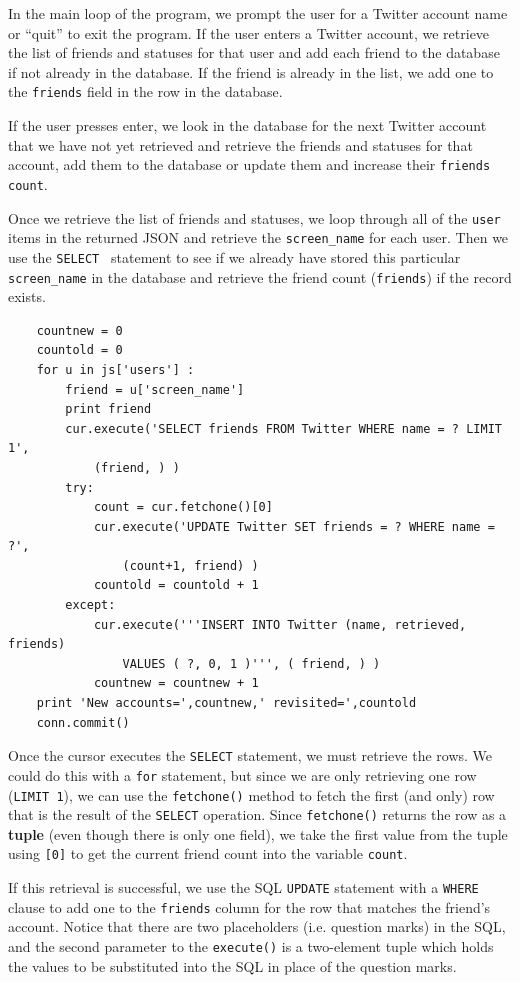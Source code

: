 In the main loop of the program, we prompt the user for a Twitter
account name or ``quit'' to exit the program.  
If the user enters a Twitter account, we retrieve the 
list of friends and statuses
for that user and add each friend to the database if 
not already in the database.  If the friend is already in the list, 
we add one to the {\tt friends} field in the row in the database.

If the user presses enter, we look in the database for the next 
Twitter account that we have not yet retrieved and retrieve the
friends and statuses for that account, add them to the database 
or update them and increase their {\tt friends count}.

Once we retrieve the list of friends and statuses, we loop 
through all of the {\tt user} items in the returned JSON
and retrieve the \verb"screen_name" for each user.  Then we use
the {\tt SELECT } statement to see if we already have stored this
particular \verb"screen_name" in the database and retrieve the
friend count ({\tt friends}) if the record exists.

\beforeverb
\begin{verbatim}
    countnew = 0
    countold = 0
    for u in js['users'] :
        friend = u['screen_name']
        print friend
        cur.execute('SELECT friends FROM Twitter WHERE name = ? LIMIT 1', 
            (friend, ) )
        try:
            count = cur.fetchone()[0]
            cur.execute('UPDATE Twitter SET friends = ? WHERE name = ?', 
                (count+1, friend) )
            countold = countold + 1
        except:
            cur.execute('''INSERT INTO Twitter (name, retrieved, friends) 
                VALUES ( ?, 0, 1 )''', ( friend, ) )
            countnew = countnew + 1
    print 'New accounts=',countnew,' revisited=',countold
    conn.commit()
\end{verbatim}
\afterverb
%
Once the cursor executes the {\tt SELECT} statement, 
we must retrieve the rows.  We could do this with a {\tt for} 
statement, but since we are only retrieving
one row ({\tt LIMIT 1}), we can use the {\tt fetchone()} method to fetch the
first (and only) row that is the result of the {\tt SELECT} operation.  
Since {\tt fetchone()} returns the row as a {\bf tuple} (even though there is only
one field), we take the first value from the tuple using {\tt [0]} to get the 
current friend count into the variable {\tt count}.  

If this retrieval is successful, we use the SQL {\tt UPDATE} statement with a 
{\tt WHERE} clause to add one to the {\tt friends} column for the row that 
matches the friend's account.  Notice that there are two placeholders (i.e.
question marks) in the SQL, and the second parameter to the {\tt execute()} is
a two-element tuple which holds the values to be substituted into the SQL
in place of the question marks.

